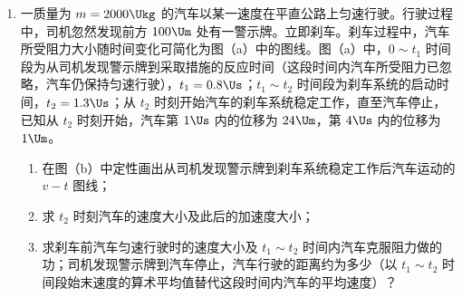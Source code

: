 \documentclass[\gkver]{gaokaozhenti}
\begin{document}
\begin{enumerate}
\item
一质量为 $m=2000\Ukg$ 的汽车以某一速度在平直公路上匀速行驶。行驶过程中，司机忽然发现前方 $100\Um$ 处有一警示牌。立即刹车。刹车过程中，汽车所受阻力大小随时间变化可简化为图（a）中的图线。图（a）中，$0\sim t_1$ 时间段为从司机发现警示牌到采取措施的反应时间（这段时间内汽车所受阻力已忽略，汽车仍保持匀速行驶），$t_1=0.8\Us$；$t_1\sim t_2$ 时间段为刹车系统的启动时间，$t_2=1.3\Us$；从 $t_2$ 时刻开始汽车的刹车系统稳定工作，直至汽车停止，已知从 $t_2$ 时刻开始，汽车第 $1\Us$ 内的位移为 $24\Um$，第 $4\Us$ 内的位移为 $1\Um$。
\begin{enumerate}
	\item
	在图（b）中定性画出从司机发现警示牌到刹车系统稳定工作后汽车运动的 $v-t$ 图线；
	\item
	求 $t_2$ 时刻汽车的速度大小及此后的加速度大小；
	\item
	求刹车前汽车匀速行驶时的速度大小及 $t_1\sim t_2$ 时间内汽车克服阻力做的功；司机发现警示牌到汽车停止，汽车行驶的距离约为多少（以 $t_1\sim t_2$ 时间段始末速度的算术平均值替代这段时间内汽车的平均速度）？
\end{enumerate}
\end{enumerate}
\end{document}
